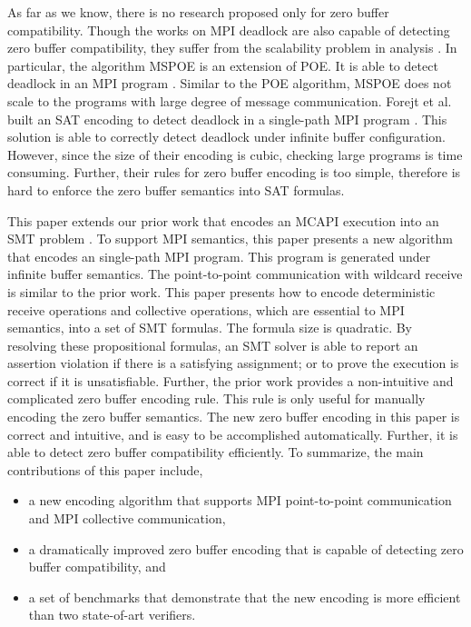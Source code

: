 As far as we know, there is no research proposed only for zero buffer compatibility. Though the works on MPI deadlock are also capable of detecting zero buffer compatibility, they suffer from the scalability problem in analysis \cite{DBLP:conf/sbmf/SharmaGB12,DBLP:conf/fm/ForejtKNS14}. In particular, the algorithm MSPOE is an extension of POE. It is able to detect deadlock in an MPI program \cite{DBLP:conf/sbmf/SharmaGB12}. Similar to the POE algorithm, MSPOE does not scale to the programs with large degree of message communication. Forejt et al. built an SAT encoding to detect deadlock in a single-path MPI program \cite{DBLP:conf/fm/ForejtKNS14}. This solution is able to correctly detect deadlock under infinite buffer configuration. However, since the size of their encoding is cubic, checking large programs is time consuming. Further, their rules for zero buffer encoding is too simple, therefore is hard to enforce the zero buffer semantics into SAT formulas. 

This paper extends our prior work that encodes an MCAPI execution into an SMT problem \cite{DBLP:conf/kbse/HuangMM13}. To support MPI semantics, this paper presents a new algorithm that encodes an single-path MPI program. This program is generated under infinite buffer semantics. The point-to-point communication with wildcard receive is similar to the prior work. This paper presents how to encode deterministic receive operations and collective operations, which are essential to MPI semantics, into a set of SMT formulas. The formula size is quadratic. By resolving these propositional formulas, an SMT solver is able to report an assertion violation if there is a satisfying assignment; or to prove the execution is correct if it is unsatisfiable. Further, the prior work \cite{DBLP:conf/kbse/HuangMM13} provides a non-intuitive and complicated zero buffer encoding rule. This rule is only useful for manually encoding the zero buffer semantics. The new zero buffer encoding in this paper is correct and intuitive, and is easy to be accomplished automatically. Further, it is able to detect zero buffer compatibility efficiently. To summarize, the main contributions of this paper include,
\begin{itemize}
\item a new encoding algorithm that supports MPI point-to-point communication and MPI collective communication,
\item a dramatically improved zero buffer encoding that is capable of detecting zero buffer compatibility, and
\item a set of benchmarks that demonstrate that the new encoding is more efficient than two state-of-art verifiers.
\end{itemize}

